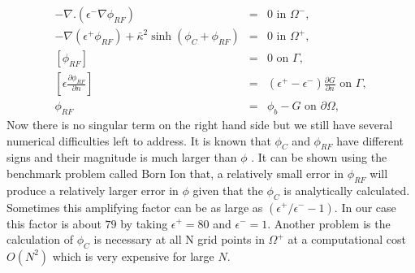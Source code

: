 \begin{eqnarray}
		-\nabla.(\epsilon^- \nabla  \phi_{RF}) &=& 0 \text{ in } \Omega^-,\\  
		-\nabla(\epsilon^+ \phi_{RF}) +\bar\kappa^2 \sinh(\phi_C+\phi_{RF})&=& 0 \text{ in } \Omega^+,\\
		\left[\phi_{RF}\right] &=& 0 \text{ on } \Gamma, \\
		\left[\epsilon\frac{\partial \phi_{RF}}{\partial n}\right]&=& (\epsilon^+-\epsilon^- ) \frac{\partial G}{\partial n} \text{ on } \Gamma,\\
		\phi_{RF}&=& \phi_b-G \text{ on } \partial \Omega ,\label{rf_sys}
\end{eqnarray} 
Now there is no singular term on the right hand side but we still have several numerical difficulties left to address. It is known that $\phi_C$ and $\phi_{RF}$ have different signs and their magnitude is much larger than $\phi$ \cite{Holst2010}. It can be shown \cite{Holst2010} using the benchmark problem called Born Ion that, a relatively small error in $\phi_{RF}$ will produce a relatively larger error in $\phi$ given that the $\phi_C$ is analytically calculated. Sometimes this amplifying factor \cite{Holst2010} can be as large as $(\epsilon^+/\epsilon^- - 1 )$. In our case this factor is about $79$ by taking $\epsilon^+=80$ and $\epsilon^-=1$. Another problem is the calculation of $\phi_C$ is necessary at all N grid points in $\Omega^+$ at a computational cost $O(N^2)$ which is very expensive for large $N$. 

